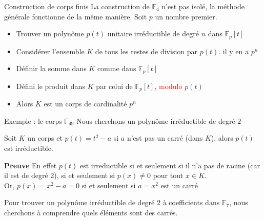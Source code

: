\begin{parag}{Construction de corps finis}
    La construction de $\mathbb{F}_4$ n'est pas isolé, la méthode générale fonctionne de la même manière. Soit $p$ un nombre premier.
    \begin{itemize}
        \item Trouver un polynôme $p(t)$ unitaire irréductible de degré $n$ dans $\mathbb{F}_p[t]$
        \item Considérer l'ensemble $K$ de tous les restes de division par $p(t)$. il y en a $p^n$
        \item Définir la somme dans $K$ comme dans $\mathbb{F}_p[t]$
        \item Défini le produit dans $K$ par celui de $\mathbb{F}_p[t]$, \textcolor{red}{modulo} $p(t)$
        \item Alors $K$ est un corps de cardinalité $p^n$
    \end{itemize}

    \begin{subparag}{Exemple : le corps $\mathbb{F}_{49}$}
        Nous cherchons un polynôme irréductible de degré $2$
        \begin{proposition}
            Soit $K$ un corps et $p(t) = t^2 - a$ si $a$ n'est pas un carré (dans $K$), alors $p(t)$ est irréductible.
        \end{proposition}
        \textbf{Preuve}
        En effet $p(t)$ est irreductible si et seulement si il n'a pas de racine (car il est de degré 2), si et seulement si $p(x) \neq 0$ pour tout $x \in K$.
        \\
        Or, $p(x) = x^2 - a = 0$ si et seulement si $a = x^2$ est un carré
        \begin{framedremark}
            Pour trouver un polynôme irréductible de degré $2$ à coefficients dans $\mathbb{F}_7$, nous cherchons à comprendre quels éléments sont des carrés.
        \end{framedremark}


\end{subparag}
\end{parag}
